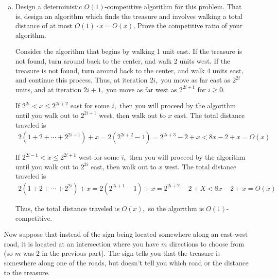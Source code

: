 \documentclass{article}
\begin{document}
\begin{enumerate}[(a)]
	\item Design a deterministic $O(1)$-competitive algorithm for this problem.  That is, design an algorithm which finds the treasure and involves walking a total distance of at most $O(1) \cdot x = O(x)$.  Prove the competitive ratio of your algorithm.
		\begin{soln}
			Consider the algorithm that begins by walking 1 unit east. If the treasure is not found, turn around back to the center, and walk 2 units west. If the treasure is not found, turn around back to the center, and walk 4 units east, and continue this process. Thus, at iteration $2i,$ you move as far east as $2^{2i}$ units, and at iteration $2i+1,$ you move as far west as $2^{2i+1}$ for $i\ge 0.$

			If $2^{2i}<x\le 2^{2i+2}$ east for some $i,$ then you will proceed by the algorithm until you walk out to $2^{2i+1}$ west, then walk out to $x$ east. The total distance traveled is
			\begin{align*}
				2(1+2+\cdots+2^{2i+1})+x = 2(2^{2i+2}-1) = 2^{2i+3}-2 + x < 8x - 2 + x = O(x)
			\end{align*}

			If $2^{2i-1}<x\le 2^{2i+1}$ west for some $i,$ then you will proceed by the algorithm until you walk out to $2^{2i}$ east, then walk out to $x$ west. The total distance traveled is
			\begin{align*}
				2(1+2+\cdots+2^{2i}) + x = 2(2^{2i+1}-1) + x = 2^{2i+2}-2+X < 8x - 2 + x = O(x)
			\end{align*}

			Thus, the total distance traveled is $O(x),$ so the algorithm is $O(1)$-competitive.
		\end{soln}

\end{enumerate}

Now suppose that instead of the sign being located somewhere along an east-west road, it is located at an intersection where you have $m$ directions to choose from (so $m$ was $2$ in the previous part).  The sign tells you that the treasure is somewhere along one of the roads, but doesn't tell you which road or the distance to the treasure.  
\end{document}
